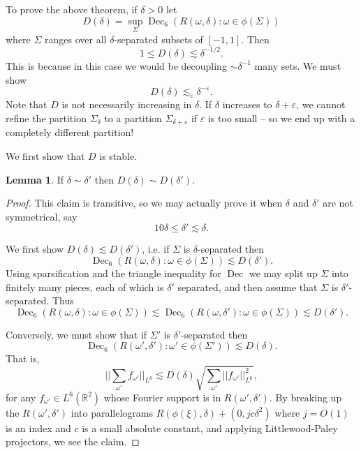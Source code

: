 \documentclass[12pt]{report}
\newcommand{\RR}{\mathbb{R}}
\newcommand{\Dec}{\operatorname{Dec}}
\theoremstyle{definition}
\newtheorem{lemma}[theorem]{Lemma}
\begin{document}
To prove the above theorem, if $\delta > 0$ let
$$D(\delta) = \sup_\Sigma \Dec_6(R(\omega, \delta): \omega \in \phi(\Sigma))$$
where $\Sigma$ ranges over all $\delta$-separated subsets of $[-1, 1]$. Then
$$1 \leq D(\delta) \lesssim \delta^{-1/2}.$$
This is because in this case we would be decoupling $\sim \delta^{-1}$ many sets.
We must show
$$D(\delta) \lesssim_\varepsilon \delta^{-\varepsilon}.$$
Note that $D$ is not necessarily increasing in $\delta$.
If $\delta$ increases to $\delta + \varepsilon$, we cannot refine the partition $\Sigma_\delta$ to a partition $\Sigma_{\delta + \varepsilon}$ if $\varepsilon$ is too small -- so we end up with a completely different partition!

We first show that $D$ is stable.
\begin{lemma}
If $\delta \sim \delta'$ then $D(\delta) \sim D(\delta')$.
\end{lemma}
\begin{proof}
This claim is transitive, so we may actually prove it when $\delta$ and $\delta'$ are not symmetrical, say
$$10\delta \leq \delta' \lesssim \delta.$$

We first show $D(\delta) \lesssim D(\delta')$, i.e. if $\Sigma$ is $\delta$-separated then
$$\Dec_6(R(\omega, \delta): \omega \in \phi(\Sigma)) \lesssim D(\delta').$$
Using sparsification and the triangle inequality for $\Dec$ we may split up $\Sigma$ into finitely many pieces, each of which is $\delta'$ separated, and then assume that $\Sigma$ is $\delta'$-separated.
Thus
$$\Dec_6(R(\omega, \delta): \omega \in \phi(\Sigma)) \lesssim \Dec_6(R(\omega,\delta'): \omega \in \phi(\Sigma)) \lesssim D(\delta').$$

Conversely, we must show that if $\Sigma'$ is $\delta'$-separated then
$$\Dec_6(R(\omega', \delta'): \omega' \in \phi(\Sigma')) \lesssim D(\delta).$$
That is,
$$||\sum_{\omega'} f_{\omega'}||_{L^6} \lesssim D(\delta)\sqrt{\sum_{\omega'} ||f_{\omega'}||_{L^6}^2},$$
for any $f_{\omega'} \in L^6(\RR^2)$ whose Fourier support is in $R(\omega', \delta')$.
By breaking up the $R(\omega', \delta')$ into parallelograms $R(\phi(\xi),\delta) + (0, jc\delta^2)$ where $j = O(1)$ is an index and $c$ is a small absolute constant, and applying Littlewood-Paley projectors, we see the claim.
\end{proof}
\end{document}
